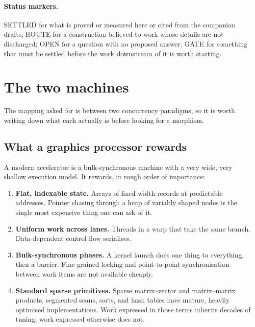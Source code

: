 \documentclass[11pt,a4paper]{article}
\theoremstyle{plain}
\theoremstyle{definition}
\theoremstyle{remark}
\begin{document}
\paragraph{Status markers.} \textsf{SETTLED} for what is proved or measured
here or cited from the companion drafts; \textsf{ROUTE} for a construction
believed to work whose details are not discharged; \textsf{OPEN} for a
question with no proposed answer; \textsf{GATE} for something that must be
settled before the work downstream of it is worth starting.

\section{The two machines}
\label{sec:machines}

The mapping asked for is between two concurrency paradigms, so it is worth
writing down what each actually is before looking for a morphism.

\subsection{What a graphics processor rewards}

A modern accelerator is a bulk-synchronous machine with a very wide, very
shallow execution model. It rewards, in rough order of importance:

\begin{enumerate}[label=(G\arabic*),leftmargin=3em]
\item \textbf{Flat, indexable state.} Arrays of fixed-width records at
  predictable addresses. Pointer chasing through a heap of variably shaped
  nodes is the single most expensive thing one can ask of it.
\item \textbf{Uniform work across lanes.} Threads in a warp that take the same
  branch. Data-dependent control flow serialises.
\item \textbf{Bulk-synchronous phases.} A kernel launch does one thing to
  everything, then a barrier. Fine-grained locking and point-to-point
  synchronisation between work items are not available cheaply.
\item \textbf{Standard sparse primitives.} Sparse matrix--vector and
  matrix--matrix products, segmented scans, sorts, and hash tables have
  mature, heavily optimised implementations. Work expressed in those terms
  inherits decades of tuning; work expressed otherwise does not.
\end{enumerate}
\end{document}
